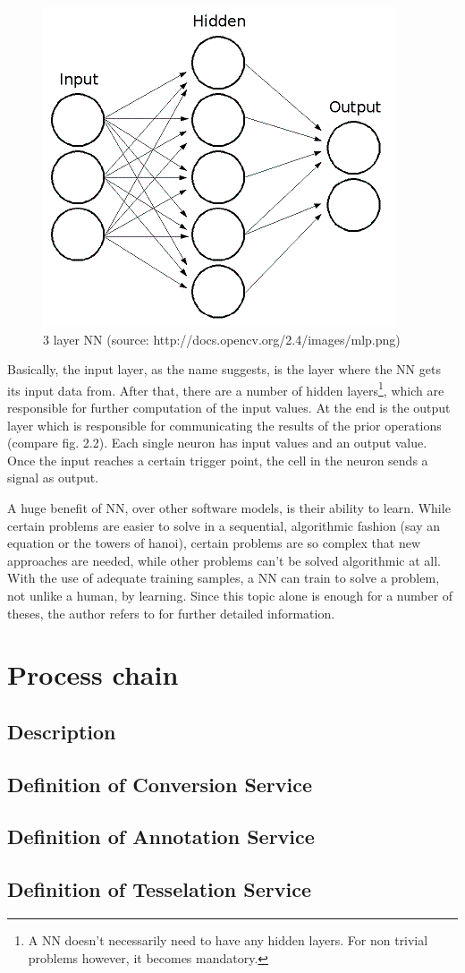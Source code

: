 \begin{figure}[H]
	\begin{center}
		\includegraphics[scale=0.7]{img/mlp.png}
		\caption{3 layer NN (source: http://docs.opencv.org/2.4/\textunderscore images/mlp.png)}
		\label{fig:fig2.2}
	\end{center}
\end{figure}

Basically, the input layer, as the name suggests, is the layer where the NN gets its input data from. After that, there are a number of hidden layers\footnote{A NN doesn't necessarily need to have any hidden layers. For non trivial problems however, it becomes mandatory.}, which are responsible for further computation of the input values. At the end is the output layer which is responsible for communicating the results of the prior operations (compare fig. 2.2). Each single neuron has input values and an output value. Once the input reaches a certain trigger point, the cell in the neuron sends a signal as output. 

A huge benefit of NN, over other software models, is their ability to learn. While certain problems are easier to solve in a sequential, algorithmic fashion (say an equation or the towers of hanoi), certain problems are so complex that new approaches are needed, while other problems can't be solved algorithmic at all. With the use of adequate training samples, a NN can train to solve a problem, not unlike a human, by learning. Since this topic alone is enough for a number of theses, the author refers to \cite{Kriesel07} for further detailed information.


\section{Process chain}
\subsection{Description}
\subsection{Definition of Conversion Service}
\subsection{Definition of Annotation Service}
\subsection{Definition of Tesselation Service}